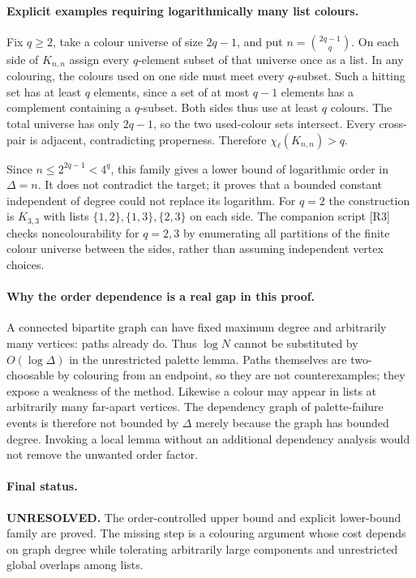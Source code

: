 \documentclass[11pt,a4paper]{article}
\begin{document}
\paragraph{Explicit examples requiring logarithmically many list colours.}
Fix $q\ge2$, take a colour universe of size $2q-1$, and put
$n=\binom{2q-1}{q}$. On each side of $K_{n,n}$ assign every
$q$-element subset of that universe once as a list. In any colouring,
the colours used on one side must meet every $q$-subset. Such a
hitting set has at least $q$ elements, since a set of at most $q-1$
elements has a complement containing a $q$-subset. Both sides thus
use at least $q$ colours. The total universe has only $2q-1$, so
the two used-colour sets intersect. Every cross-pair is adjacent,
contradicting properness. Therefore $\chi_\ell(K_{n,n})>q$.

Since $n\le2^{2q-1}<4^q$, this family gives a lower bound of
logarithmic order in $\Delta=n$. It does not contradict the target;
it proves that a bounded constant independent of degree could not
replace its logarithm. For $q=2$ the construction is $K_{3,3}$
with lists $\{1,2\},\{1,3\},\{2,3\}$ on each side.
The companion script [R3] checks noncolourability for $q=2,3$ by
enumerating all partitions of the finite colour universe between the
sides, rather than assuming independent vertex choices.

\paragraph{Why the order dependence is a real gap in this proof.}
A connected bipartite graph can have fixed maximum degree and
arbitrarily many vertices: paths already do. Thus $\log N$ cannot
be substituted by $O(\log\Delta)$ in the unrestricted palette lemma.
Paths themselves are two-choosable by colouring from an endpoint, so
they are not counterexamples; they expose a weakness of the method.
Likewise a colour may appear in lists at arbitrarily many far-apart
vertices. The dependency graph of palette-failure events is therefore
not bounded by $\Delta$ merely because the graph has bounded degree.
Invoking a local lemma without an additional dependency analysis would
not remove the unwanted order factor.

\paragraph{Final status.}
\textbf{UNRESOLVED.} The order-controlled upper bound and explicit
lower-bound family are proved. The missing step is a colouring argument
whose cost depends on graph degree while tolerating arbitrarily large
components and unrestricted global overlaps among lists.
\end{document}
